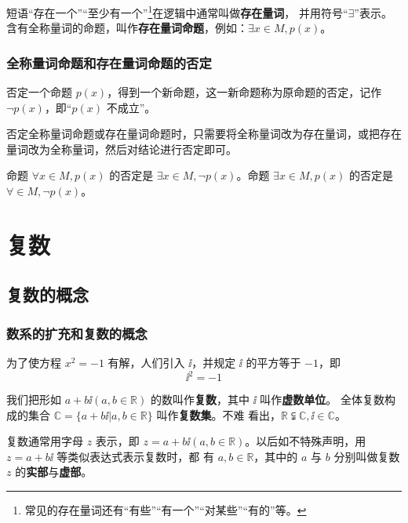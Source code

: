 \documentclass[a4paper,openany]{ctexbook}
\begin{document}
短语“存在一个”“至少有一个”\footnote{常见的存在量词还有“有些”“有一个”“对某些”“有的”等。}在逻辑中通常叫做\textbf{存在量词}，
并用符号“\(\exists\)”表示。含有全称量词的命题，叫作\textbf{存在量词命题}，例如：\(\exists x \in M,p(x)\)。

\subsection{全称量词命题和存在量词命题的否定}

否定一个命题 \(p(x)\)，得到一个新命题，这一新命题称为原命题的否定，记作 \(\lnot p(x)\)，即“\(p(x)\) 不成立”。

否定全称量词命题或存在量词命题时，只需要将全称量词改为存在量词，或把存在量词改为全称量词，然后对结论进行否定即可。

命题 \(\forall x \in M, p(x)\) 的否定是 \(\exists x \in M, \lnot p(x)\)。命题 \(\exists x \in M, p(x)\) 的否定是 \(\forall \in M, \lnot p(x)\)。

\chapter{复数} %

\section{复数的概念}

\subsection{数系的扩充和复数的概念}

为了使方程 \(x^2=-1\) 有解，人们引入 \(\ii\)，并规定 \(\ii\) 的平方等于 \(-1\)，即
\[
    \ii^2=-1
\]

我们把形如 \(a+b \ii(a,b\in \mathbb{R})\) 的数叫作\textbf{复数}，其中 \(\ii\) 叫作\textbf{虚数单位}。
全体复数构成的集合 \(\mathbb{C}=\{a+b \ii|a,b\in \mathbb{R}\}\) 叫作\textbf{复数集}。不难
看出，\(\mathbb{R}\subsetneqq \mathbb{C}, \ii\in \mathbb{C}\)。

复数通常用字母 \(z\) 表示，即 \(z=a+b \ii(a,b\in \mathbb{R})\)。以后如不特殊声明，用 \(z=a+b \ii\) 等类似表达式表示复数时，都
有 \(a,b\in \mathbb{R}\)，其中的 \(a\) 与 \(b\) 分别叫做复数 \(z\) 的\textbf{实部}与\textbf{虚部}。
\end{document}

